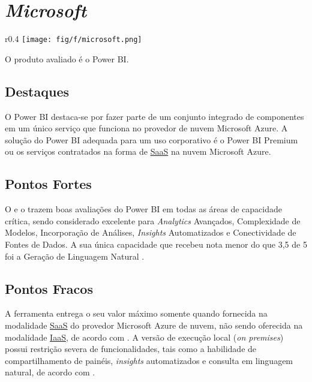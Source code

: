 \section{\emph{Microsoft}}
\label{sub-microsoft}

\begin{wrapfigure}[3]{r}{0.4\textwidth}     
    \centering
    \texttt{[image: fig/f/microsoft.png]}
\end{wrapfigure}

O produto avaliado é o Power BI.

\subsection*{Destaques}

O Power BI destaca-se por fazer parte de um conjunto integrado de componentes em um único serviço que funciona no provedor de nuvem Microsoft Azure. A solução do Power BI adequada para um uso corporativo é o Power BI Premium ou os serviços contratados na forma de \hyperref[saas]{SaaS} na nuvem Microsoft Azure.

\subsection*{Pontos Fortes}

O \relGMQ \xspace e o \relGCC \xspace trazem boas avaliações do Power BI em todas as áreas de capacidade crítica, sendo considerado excelente para \emph{Analytics} Avançados, Complexidade de Modelos, Incorporação de Análises, \emph{Insights} Automatizados e Conectividade de Fontes de Dados. A sua única capacidade que recebeu nota menor do que 3,5 de 5 foi a Geração de Linguagem Natural \cite{gartner:criticalcapabilities}.

\subsection*{Pontos Fracos}

A ferramenta entrega o seu valor máximo somente quando fornecida na modalidade \hyperref[saas]{SaaS} do provedor Microsoft Azure de nuvem, não sendo oferecida na modalidade \hyperref[iaas]{IaaS}, de acordo com \cite{gartner:criticalcapabilities}. A versão de execução local (\emph{on premises}) possui restrição severa de funcionalidades, tais como a habilidade de compartilhamento de painéis, \emph{insights} automatizados e consulta em linguagem natural, de acordo com \cite{gartner:criticalcapabilities}.

